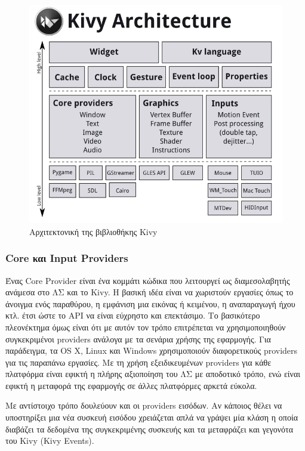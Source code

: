 \begin{figure}[ht]
    \centering
    \includegraphics[scale=0.5]{images/chapter3/kivy_architecture.png}
    \caption{Αρχιτεκτονική της βιβλιοθήκης Kivy}
    \label{fig:kivy_arch}
\end{figure}

\subsubsection{Core και Input Providers}
Ένας Core Provider είναι ένα κομμάτι κώδικα που λειτουργεί ως διαμεσολαβητής ανάμεσα στο ΛΣ και το Kivy. Η βασική ιδέα είναι να χωριστούν εργασίες όπως το άνοιγμα ενός παραθύρου, η εμφάνιση μια εικόνας ή κειμένου, η αναπαραγωγή ήχου κτλ. έτσι ώστε το API να είναι εύχρηστο και επεκτάσιμο. Το βασικότερο πλεονέκτημα όμως είναι ότι με αυτόν τον τρόπο επιτρέπεται να χρησιμοποιηθούν συγκεκριμένοι providers ανάλογα με τα σενάρια χρήσης της εφαρμογής. Για παράδειγμα, τα OS X, Linux και Windows χρησιμοποιούν διαφορετικούς providers για τις παραπάνω εργασίες. Με τη χρήση εξειδικευμένων providers για κάθε πλατφόρμα είναι εφικτή η πλήρης αξιοποίηση του ΛΣ με αποδοτικό τρόπο, ενώ είναι εφικτή η μεταφορά της εφαρμογής σε άλλες πλατφόρμες αρκετά εύκολα.

Με αντίστοιχο τρόπο δουλεύουν και οι providers εισόδων. Αν κάποιος θέλει να υποστηρίξει μια νέα συσκευή εισόδου χρειάζεται απλά να γράψει μία κλάση η οποία διαβάζει τα δεδομένα της συγκεκριμένης συσκευής και τα μεταφράζει και γεγονότα του Kivy (Kivy Events).

